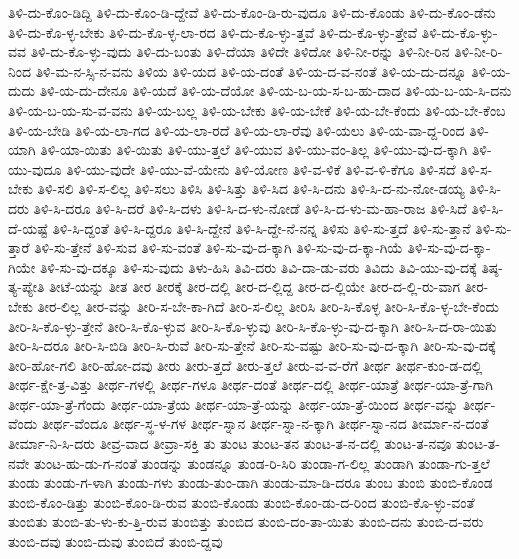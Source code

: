 {ತಿಳಿ-ದು-ಕೊಂ-ಡಿದ್ದಿ
ತಿಳಿ-ದು-ಕೊಂ-ಡಿ-ದ್ದೇವೆ
ತಿಳಿ-ದು-ಕೊಂ-ಡಿ-ರು-ವುದೂ
ತಿಳಿ-ದು-ಕೊಂಡು
ತಿಳಿ-ದು-ಕೊಂ-ಡೆನು
ತಿಳಿ-ದು-ಕೊ-ಳ್ಳ-ಬೇಕು
ತಿಳಿ-ದು-ಕೊ-ಳ್ಳ-ಲಾ-ರದ
ತಿಳಿ-ದು-ಕೊ-ಳ್ಳು-ತ್ತವೆ
ತಿಳಿ-ದು-ಕೊ-ಳ್ಳು-ತ್ತೇವೆ
ತಿಳಿ-ದು-ಕೊ-ಳ್ಳು-ವವ
ತಿಳಿ-ದು-ಕೊ-ಳ್ಳು-ವುದು
ತಿಳಿ-ದು-ಬಂತು
ತಿಳಿ-ದೆಯಾ
ತಿಳಿದೇ
ತಿಳಿದೋ
ತಿಳಿ-ನೀ-ರನ್ನು
ತಿಳಿ-ನೀ-ರಿನ
ತಿಳಿ-ನೀ-ರಿ-ನಿಂದ
ತಿಳಿ-ಮ-ನ-ಸ್ಸಿ-ನ-ವನು
ತಿಳಿಯ
ತಿಳಿ-ಯದ
ತಿಳಿ-ಯ-ದಂತೆ
ತಿಳಿ-ಯ-ದ-ವ-ನಂತೆ
ತಿಳಿ-ಯ-ದು-ದನ್ನೂ
ತಿಳಿ-ಯ-ದುದು
ತಿಳಿ-ಯ-ದು-ದೇನೂ
ತಿಳಿ-ಯದೆ
ತಿಳಿ-ಯ-ದೆಯೋ
ತಿಳಿ-ಯ-ಬ-ಯ-ಸ-ಬ-ಹು-ದಾದ
ತಿಳಿ-ಯ-ಬ-ಯ-ಸಿ-ದನು
ತಿಳಿ-ಯ-ಬ-ಯ-ಸು-ವ-ವನು
ತಿಳಿ-ಯ-ಬಲ್ಲ
ತಿಳಿ-ಯ-ಬೇಕು
ತಿಳಿ-ಯ-ಬೇಕೆ
ತಿಳಿ-ಯ-ಬೇ-ಕೆಂದು
ತಿಳಿ-ಯ-ಬೇ-ಕೆಂಬ
ತಿಳಿ-ಯ-ಬೇಡಿ
ತಿಳಿ-ಯ-ಲಾ-ಗದ
ತಿಳಿ-ಯ-ಲಾ-ರದೆ
ತಿಳಿ-ಯ-ಲಾ-ರೆವು
ತಿಳಿ-ಯಲು
ತಿಳಿ-ಯ-ವಾ-ದ್ದ-ರಿಂದ
ತಿಳಿ-ಯಾಗಿ
ತಿಳಿ-ಯಾ-ಯಿತು
ತಿಳಿ-ಯಿತು
ತಿಳಿ-ಯು-ತ್ತಲೆ
ತಿಳಿ-ಯುವ
ತಿಳಿ-ಯು-ವಂ-ತಿಲ್ಲ
ತಿಳಿ-ಯು-ವು-ದ-ಕ್ಕಾಗಿ
ತಿಳಿ-ಯು-ವುದೂ
ತಿಳಿ-ಯು-ವುದೇ
ತಿಳಿ-ಯು-ವೆ-ಯೇನು
ತಿಳಿ-ಯೋಣ
ತಿಳಿ-ವ-ಳಿಕೆ
ತಿಳಿ-ವ-ಳಿ-ಕೆಗೂ
ತಿಳಿ-ಸದೆ
ತಿಳಿ-ಸ-ಬೇಕು
ತಿಳಿ-ಸಲಿ
ತಿಳಿ-ಸ-ಲಿಲ್ಲ
ತಿಳಿ-ಸಲು
ತಿಳಿಸಿ
ತಿಳಿ-ಸಿತ್ತು
ತಿಳಿ-ಸಿದ
ತಿಳಿ-ಸಿ-ದನು
ತಿಳಿ-ಸಿ-ದ-ನು-ನೋ-ಡಯ್ಯ
ತಿಳಿ-ಸಿ-ದರು
ತಿಳಿ-ಸಿ-ದರೂ
ತಿಳಿ-ಸಿ-ದರೆ
ತಿಳಿ-ಸಿ-ದಳು
ತಿಳಿ-ಸಿ-ದ-ಳು-ನೋಡೆ
ತಿಳಿ-ಸಿ-ದ-ಳು-ಮ-ಹಾ-ರಾಜ
ತಿಳಿ-ಸಿದೆ
ತಿಳಿ-ಸಿ-ದೆ-ಯಷ್ಟೆ
ತಿಳಿ-ಸಿ-ದ್ದಂತೆ
ತಿಳಿ-ಸಿ-ದ್ದರೂ
ತಿಳಿ-ಸಿ-ದ್ದೇನೆ
ತಿಳಿ-ಸಿ-ದ್ದೇ-ನೆ-ನನ್ನ
ತಿಳಿಸು
ತಿಳಿ-ಸು-ತ್ತದೆ
ತಿಳಿ-ಸು-ತ್ತಾನೆ
ತಿಳಿ-ಸು-ತ್ತಾರೆ
ತಿಳಿ-ಸು-ತ್ತೇನೆ
ತಿಳಿ-ಸುವ
ತಿಳಿ-ಸು-ವಂತೆ
ತಿಳಿ-ಸು-ವು-ದ-ಕ್ಕಾಗಿ
ತಿಳಿ-ಸು-ವು-ದ-ಕ್ಕಾ-ಗಿಯೆ
ತಿಳಿ-ಸು-ವು-ದ-ಕ್ಕಾ-ಗಿಯೇ
ತಿಳಿ-ಸು-ವು-ದಕ್ಕೂ
ತಿಳಿ-ಸು-ವುದು
ತಿಳು-ಹಿಸಿ
ತಿವಿ-ದರು
ತಿವಿ-ದಾ-ಡು-ವರು
ತಿವಿದು
ತಿವಿ-ಯು-ವು-ದಕ್ಕೆ
ತಿಷ್ಠ-ತ್ಯ-ಪ್ಯೇತಿ
ತೀಟೆ-ಯನ್ನು
ತೀತ
ತೀರ
ತೀರಕ್ಕೆ
ತೀರ-ದಲ್ಲಿ
ತೀರ-ದ-ಲ್ಲಿದ್ದ
ತೀರ-ದ-ಲ್ಲಿಯೇ
ತೀರ-ದ-ಲ್ಲಿ-ರು-ವಾಗ
ತೀರ-ಬೇಕು
ತೀರ-ಲಿಲ್ಲ
ತೀರ-ವನ್ನು
ತೀರಿ-ಸ-ಬೇ-ಕಾ-ಗಿದೆ
ತೀರಿ-ಸ-ಲಿಲ್ಲ
ತೀರಿಸಿ
ತೀರಿ-ಸಿ-ಕೊಳ್ಳ
ತೀರಿ-ಸಿ-ಕೊ-ಳ್ಳ-ಬೇ-ಕೆಂದು
ತೀರಿ-ಸಿ-ಕೊ-ಳ್ಳು-ತ್ತೇನೆ
ತೀರಿ-ಸಿ-ಕೊ-ಳ್ಳುವ
ತೀರಿ-ಸಿ-ಕೊ-ಳ್ಳುವು
ತೀರಿ-ಸಿ-ಕೊ-ಳ್ಳು-ವು-ದ-ಕ್ಕಾಗಿ
ತೀರಿ-ಸಿ-ದ-ರಾ-ಯಿತು
ತೀರಿ-ಸಿ-ದರೂ
ತೀರಿ-ಸಿ-ಬಿಡಿ
ತೀರಿ-ಸಿ-ರುವೆ
ತೀರಿ-ಸು-ತ್ತೇನೆ
ತೀರಿ-ಸು-ವಷ್ಟು
ತೀರಿ-ಸು-ವು-ದ-ಕ್ಕಾಗಿ
ತೀರಿ-ಸು-ವು-ದಕ್ಕೆ
ತೀರಿ-ಹೋ-ಗಲಿ
ತೀರಿ-ಹೋ-ದವು
ತೀರು
ತೀರು-ತ್ತದೆ
ತೀರು-ತ್ತಲೆ
ತೀರು-ವ-ವ-ರೆಗೆ
ತೀರ್ಥ
ತೀರ್ಥ-ಕುಂ-ಡ-ದಲ್ಲಿ
ತೀರ್ಥ-ಕ್ಷೇ-ತ್ರ-ವಿತ್ತು
ತೀರ್ಥ-ಗಳಲ್ಲಿ
ತೀರ್ಥ-ಗಳೂ
ತೀರ್ಥ-ದಂತೆ
ತೀರ್ಥ-ದಲ್ಲಿ
ತೀರ್ಥ-ಯಾತ್ರೆ
ತೀರ್ಥ-ಯಾ-ತ್ರೆ-ಗಾಗಿ
ತೀರ್ಥ-ಯಾ-ತ್ರೆ-ಗೆಂದು
ತೀರ್ಥ-ಯಾ-ತ್ರೆಯ
ತೀರ್ಥ-ಯಾ-ತ್ರೆ-ಯನ್ನು
ತೀರ್ಥ-ಯಾ-ತ್ರೆ-ಯಿಂದ
ತೀರ್ಥ-ವನ್ನು
ತೀರ್ಥ-ವೆಂದು
ತೀರ್ಥ-ವೆಂದೂ
ತೀರ್ಥ-ಸ್ಥ-ಳ-ಗಳ
ತೀರ್ಥ-ಸ್ನಾನ
ತೀರ್ಥ-ಸ್ನಾ-ನ-ಕ್ಕಾಗಿ
ತೀರ್ಥ-ಸ್ನಾ-ನದ
ತೀರ್ಮಾ-ನ-ದಂತೆ
ತೀರ್ಮಾ-ನಿ-ಸಿ-ದರು
ತೀವ್ರ-ವಾದ
ತೀವ್ರಾ-ಸಕ್ತಿ
ತು
ತುಂಟ
ತುಂಟ-ತನ
ತುಂಟ-ತ-ನ-ದಲ್ಲಿ
ತುಂಟ-ತ-ನವೂ
ತುಂಟ-ತ-ನವೇ
ತುಂಟ-ಹು-ಡು-ಗ-ನಂತೆ
ತುಂಡನ್ನು
ತುಂಡನ್ನೂ
ತುಂಡ-ರಿ-ಸಿರಿ
ತುಂಡಾ-ಗ-ಲಿಲ್ಲ
ತುಂಡಾಗಿ
ತುಂಡಾ-ಗು-ತ್ತಲೆ
ತುಂಡು
ತುಂಡು-ಗ-ಳಾಗಿ
ತುಂಡು-ಗಳು
ತುಂಡು-ತುಂ-ಡಾಗಿ
ತುಂಡು-ಮಾ-ಡಿ-ದರೂ
ತುಂಬ
ತುಂಬಿ
ತುಂಬಿ-ಕೊಂಡ
ತುಂಬಿ-ಕೊಂ-ಡಿತ್ತು
ತುಂಬಿ-ಕೊಂ-ಡಿ-ರುವ
ತುಂಬಿ-ಕೊಂಡು
ತುಂಬಿ-ಕೊಂ-ಡು-ದ-ರಿಂದ
ತುಂಬಿ-ಕೊ-ಳ್ಳು-ವಂತೆ
ತುಂಬಿತು
ತುಂಬಿ-ತು-ಳು-ಕು-ತ್ತಿ-ರುವ
ತುಂಬಿತ್ತು
ತುಂಬಿದ
ತುಂಬಿ-ದಂ-ತಾ-ಯಿತು
ತುಂಬಿ-ದನು
ತುಂಬಿ-ದ-ವರು
ತುಂಬಿ-ದವು
ತುಂಬಿ-ದುವು
ತುಂಬಿದೆ
ತುಂಬಿ-ದ್ದವು
}
